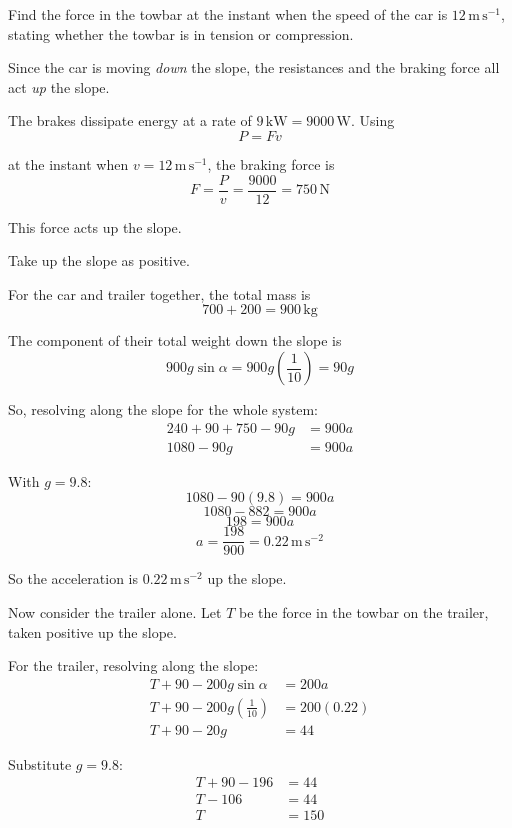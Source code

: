 \documentclass[leqno]{article}
\begin{document}
\begin{enumerate}[
  label=\textbf{\arabic*.},
  leftmargin=*,
  topsep=0pt,
  partopsep=0pt,
  parsep=0pt
]
Find the force in the towbar at the instant when the speed of the car is $12\,\mathrm{m\,s^{-1}}$, stating whether the towbar is in tension or compression.  \\

\vspace*{10pt}

\begin{djsSolution}
Since the car is moving \emph{down} the slope, the resistances and the braking force all act \emph{up} the slope.

The brakes dissipate energy at a rate of $9\,\mathrm{kW}=9000\,\mathrm{W}$.
Using
\[
P=Fv
\]

at the instant when $v=12\,\mathrm{m\,s^{-1}}$, the braking force is
\[
F=\frac{P}{v}=\frac{9000}{12}=750\,\mathrm{N}
\]

This force acts up the slope.

Take up the slope as positive.

For the car and trailer together, the total mass is
\[
700+200=900\,\mathrm{kg}
\]

The component of their total weight down the slope is
\[
900g\sin\alpha=900g\left(\frac{1}{10}\right)=90g
\]

So, resolving along the slope for the whole system:
\begin{align*}
240+90+750-90g &= 900a \\
1080-90g &= 900a
\end{align*}

With $g=9.8$:
\[
1080-90(9.8)=900a
\]
\[
1080-882=900a
\]
\[
198=900a
\]
\[
a=\frac{198}{900}=0.22\,\mathrm{m\,s^{-2}}
\]

So the acceleration is $0.22\,\mathrm{m\,s^{-2}}$ up the slope.

Now consider the trailer alone.
Let $T$ be the force in the towbar on the trailer, taken positive up the slope.

For the trailer, resolving along the slope:
\begin{align*}
T+90-200g\sin\alpha &= 200a \\
T+90-200g\left(\frac{1}{10}\right) &= 200(0.22) \\
T+90-20g &= 44
\end{align*}

Substitute $g=9.8$:
\begin{align*}
T+90-196 &= 44 \\
T-106 &= 44 \\
T &= 150
\end{align*}


\end{djsSolution}
\end{enumerate}
\end{document}
